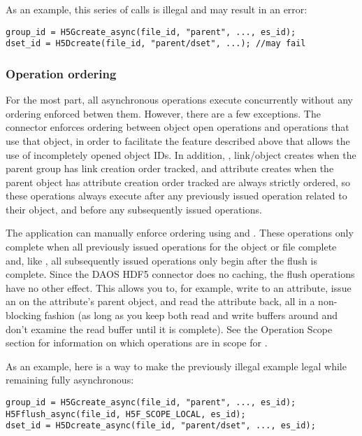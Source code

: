 \documentclass[../users_guide.tex]{subfiles}
\begin{document}
As an example, this series of calls is illegal and may result in an error:

\begin{verbatim}
group_id = H5Gcreate_async(file_id, "parent", ..., es_id);
dset_id = H5Dcreate(file_id, "parent/dset", ...); //may fail
\end{verbatim}

\subsubsection {Operation ordering}

For the most part, all asynchronous operations execute concurrently without any
ordering enforced betwen them. However, there are a few exceptions. The
connector enforces ordering between object open operations and operations that
use that object, in order to facilitate the feature described above that allows
the use of incompletely opened object IDs. In addition,
, link/object creates when the parent group
has link creation order tracked, and attribute creates when the parent object
has attribute creation order tracked are always strictly ordered, so these
operations always execute after any previously issued operation related to their
object, and before any subsequently issued operations.

The application can manually enforce ordering using
 and . These
operations only complete when all previously issued operations for the object or
file complete and, like , all subsequently
issued operations only begin after the flush is complete. Since the DAOS HDF5
connector does no caching, the flush operations have no other effect. This
allows you to, for example, write to an attribute, issue an
 on the attribute's parent object, and read the
attribute back, all in a non-blocking fashion (as long as you keep both read and
write buffers around and don't examine the read buffer until it is complete).
See the Operation Scope section for information on which operations are in scope
for .

As an example, here is a way to make the previously illegal example legal while
remaining fully asynchronous:

\begin{verbatim}
group_id = H5Gcreate_async(file_id, "parent", ..., es_id);
H5Fflush_async(file_id, H5F_SCOPE_LOCAL, es_id);
dset_id = H5Dcreate_async(file_id, "parent/dset", ..., es_id);
\end{verbatim}
\end{document}
